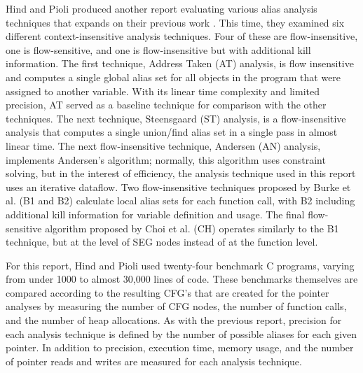 Hind and Pioli produced another report evaluating various alias analysis techniques that expands on their previous work \cite{Hind}. This time, they examined six different context-insensitive analysis techniques. Four of these are flow-insensitive, one is flow-sensitive, and one is flow-insensitive but with additional kill information. The first technique, Address Taken (AT) analysis, is flow insensitive and computes a single global alias set for all objects in the program that were assigned to another variable. With its linear time complexity and limited precision, AT served as a baseline technique for comparison with the other techniques. The next technique, Steensgaard (ST) analysis, is a flow-insensitive analysis that computes a single union/find alias set in a single pass in almost linear time. The next flow-insensitive technique, Andersen (AN) analysis, implements Andersen's algorithm; normally, this algorithm uses constraint solving, but in the interest of efficiency, the analysis technique used in this report uses an iterative dataflow. Two flow-insensitive techniques proposed by Burke et al. (B1 and B2) calculate local alias sets for each function call, with B2 including additional kill information for variable definition and usage. The final flow-sensitive algorithm proposed by Choi et al. (CH) operates similarly to the B1 technique, but at the level of SEG nodes instead of at the function level.

For this report, Hind and Pioli used twenty-four benchmark C programs, varying from under 1000 to almost 30,000 lines of code. These benchmarks themselves are compared according to the resulting CFG's that are created for the pointer analyses by measuring the number of CFG nodes, the number of function calls, and the number of heap allocations. As with the previous report, precision for each analysis technique is defined by the number of possible aliases for each given pointer. In addition to precision, execution time, memory usage, and the number of pointer reads and writes are measured for each analysis technique.


